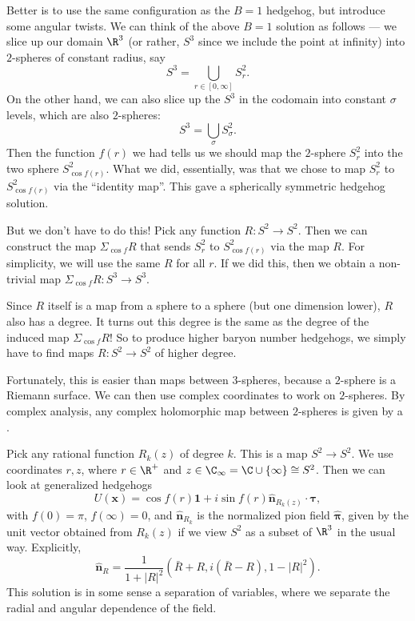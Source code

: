 \documentclass[a4paper]{article}
\begin{document}
Better is to use the same configuration as the $B = 1$ hedgehog, but introduce some angular twists. We can think of the above $B = 1$ solution as follows --- we slice up our domain $\R^3$ (or rather, $S^3$ since we include the point at infinity) into $2$-spheres of constant radius, say
\[
  S^3 = \bigcup_{r \in [0, \infty]} S_r^2.
\]
On the other hand, we can also slice up the $S^3$ in the codomain into constant $\sigma$ levels, which are also $2$-spheres:
\[
  S^3 = \bigcup_{\sigma} S_\sigma^2.
\]
Then the function $f(r)$ we had tells us we should map the $2$-sphere $S_r^2$ into the two sphere $S_{\cos f(r)}^2$. What we did, essentially, was that we chose to map $S_r^2$ to $S_{\cos f(r)}^2$ via the ``identity map''. This gave a spherically symmetric hedgehog solution.

But we don't have to do this! Pick any function $R: S^2 \to S^2$. Then we can construct the map $\Sigma_{\cos f} R$ that sends $S_r^2$ to $S_{\cos f(r)}^2$ via the map $R$. For simplicity, we will use the same $R$ for all $r$. If we did this, then we obtain a non-trivial map $\Sigma_{\cos f} R: S^3 \to S^3$.

Since $R$ itself is a map from a sphere to a sphere (but one dimension lower), $R$ also has a degree. It turns out this degree is the same as the degree of the induced map $\Sigma_{\cos f} R$! So to produce higher baryon number hedgehogs, we simply have to find maps $R: S^2 \to S^2$ of higher degree.

Fortunately, this is easier than maps between $3$-spheres, because a $2$-sphere is a Riemann surface. We can then use complex coordinates to work on $2$-spheres. By complex analysis, any complex holomorphic map between $2$-spheres is given by a .

Pick any rational function $R_k(z)$ of degree $k$. This is a map $S^2 \to S^2$. We use coordinates $r, z$, where $r \in \R^+$ and $z \in \C_\infty = \C \cup \{\infty\} \cong S^2$. Then we can look at generalized hedgehogs
\[
  U(\mathbf{x}) = \cos f(r) \mathbf{1} + i \sin f(r) \hat{\mathbf{n}}_{R_k(z)} \cdot \boldsymbol\tau,
\]
with $f(0) = \pi$, $f(\infty) = 0$, and $\hat{\mathbf{n}}_{R_k}$ is the normalized pion field $\hat{\boldsymbol\pi}$, given by the unit vector obtained from $R_k(z)$ if we view $S^2$ as a subset of $\R^3$ in the usual way. Explicitly,
\[
  \hat{\mathbf{n}}_R = \frac{1}{1 + |R|^2} (\bar{R} + R, i (\bar{R} - R), 1 - |R|^2).
\]
This solution is in some sense a separation of variables, where we separate the radial and angular dependence of the field.
\end{document}
